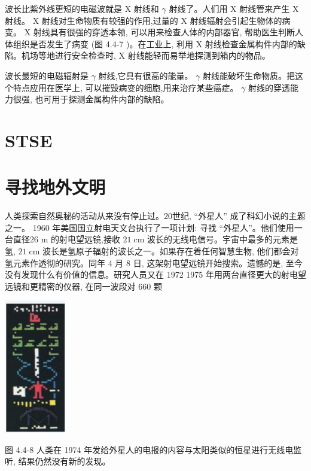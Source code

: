 \documentclass[10pt]{article}
\begin{document}
波长比紫外线更短的电磁波就是 \(\mathrm{X}\) 射线和 \(\gamma\) 射线了。人们用 \(\mathrm{X}\) 射线管来产生 \(\mathrm{X}\) 射线。 \(\mathrm{X}\) 射线对生命物质有较强的作用,过量的 \(\mathrm{X}\) 射线辐射会引起生物体的病变。 \(\mathrm{X}\) 射线具有很强的穿透本领, 可以用来检查人体的内部器官, 帮助医生判断人体组织是否发生了病变 (图 4.4-7 )。在工业上, 利用 \(\mathrm{X}\) 射线检查金属构件内部的缺陷。机场等地进行安全检查时, \(\mathrm{X}\) 射线能轻而易举地探测到箱内的物品。

波长最短的电磁辐射是 \(\gamma\) 射线,它具有很高的能量。 \(\gamma\) 射线能破坏生命物质。把这个特点应用在医学上, 可以摧毁病变的细胞,用来治疗某些癌症。 \(\gamma\) 射线的穿透能力很强, 也可用于探测金属构件内部的缺陷。

\section*{STSE}

\section*{寻找地外文明}

人类探索自然奥秘的活动从来没有停止过。20世纪, “外星人” 成了科幻小说的主题之一。 1960 年美国国立射电天文台执行了一项计划: 寻找 “外星人”。他们使用一台直径26 m 的射电望远镜,接收 \({21}\mathrm{\;{cm}}\) 波长的无线电信号。宇宙中最多的元素是氢, \({21}\mathrm{\;{cm}}\) 波长是氢原子辐射的波长之一。如果存在着任何智慧生物, 他们都会对氢元素作透彻的研究。同年 4 月 8 日, 这架射电望远镜开始搜索。遗憾的是, 至今没有发现什么有价值的信息。研究人员又在 1972 1975 年用两台直径更大的射电望远镜和更精密的仪器, 在同一波段对 660 颗

\begin{mdframed}

\begin{center}
\includegraphics[max width=0.2\textwidth]{images/01910e72-c5b7-7ed5-a6d4-fb3a5faefc32_92_561601.jpg}
\end{center}

图 4.4-8 人类在 1974 年发给外星人的电报的内容与太阳类似的恒星进行无线电监听, 结果仍然没有新的发现。

\end{mdframed}
\end{document}
